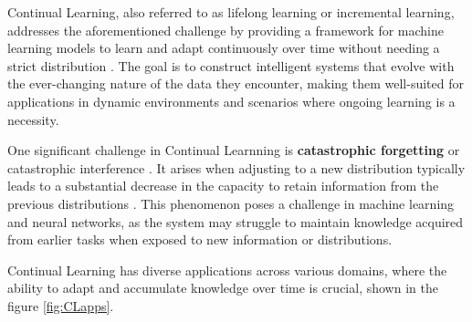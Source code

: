 \documentclass[12pt,a4paper]{article}
\begin{document}
Continual Learning, also referred to as lifelong learning or incremental learning, addresses the aforementioned challenge by providing a framework for machine learning models to learn and adapt continuously over time without needing a strict distribution \cite{contlearning}. The goal is to construct intelligent systems that evolve with the ever-changing nature of the data they encounter, making them well-suited for applications in dynamic environments and scenarios where ongoing learning is a necessity.

One significant challenge in Continual Learnning is \textbf{catastrophic forgetting} or catastrophic interference \cite{contlearning}. It arises when adjusting to a new distribution typically leads to a substantial decrease in the capacity to retain information from the previous distributions \cite{catastrophic}. This phenomenon poses a challenge in machine learning and neural networks, as the system may struggle to maintain knowledge acquired from earlier tasks when exposed to new information or distributions.

Continual Learning has diverse applications across various domains, where the ability to adapt and accumulate knowledge over time is crucial, shown in the figure \ref{fig:CLapps}.
\end{document}
